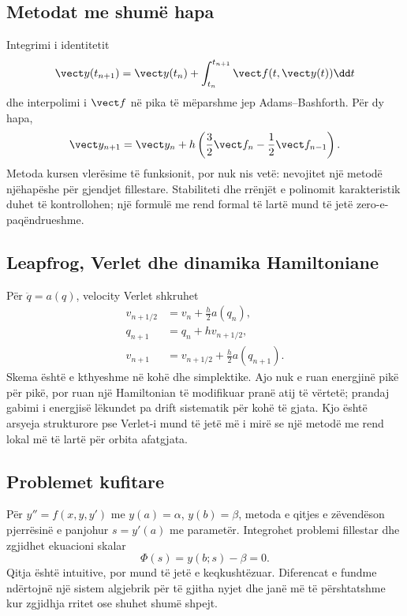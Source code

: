 \subsection{Metodat me shumë hapa}
Integrimi i identitetit
\begin{equation}
 \vect y(t_{n+1})=\vect y(t_n)+\int_{t_n}^{t_{n+1}}\vect f(t,\vect y(t))\dd t
\end{equation}
dhe interpolimi i $\vect f$ në pika të mëparshme jep Adams--Bashforth. Për dy hapa,
\begin{equation}
 \vect y_{n+1}=\vect y_n+h\left(\frac32\vect f_n-\frac12\vect f_{n-1}\right).
\end{equation}
Metoda kursen vlerësime të funksionit, por nuk nis vetë: nevojitet një metodë njëhapëshe për gjendjet fillestare. Stabiliteti dhe rrënjët e polinomit karakteristik duhet të kontrollohen; një formulë me rend formal të lartë mund të jetë zero-e-paqëndrueshme.

\subsection{Leapfrog, Verlet dhe dinamika Hamiltoniane}
Për $\ddot q=a(q)$, velocity Verlet shkruhet
\begin{align}
 v_{n+1/2}&=v_n+\frac h2a(q_n),\\
 q_{n+1}&=q_n+hv_{n+1/2},\\
 v_{n+1}&=v_{n+1/2}+\frac h2a(q_{n+1}).
\end{align}
Skema është e kthyeshme në kohë dhe simplektike. Ajo nuk e ruan energjinë pikë për pikë, por ruan një Hamiltonian të modifikuar pranë atij të vërtetë; prandaj gabimi i energjisë lëkundet pa drift sistematik për kohë të gjata. Kjo është arsyeja strukturore pse Verlet-i mund të jetë më i mirë se një metodë me rend lokal më të lartë për orbita afatgjata.

\subsection{Problemet kufitare}
Për $y''=f(x,y,y')$ me $y(a)=\alpha$, $y(b)=\beta$, metoda e qitjes e zëvendëson pjerrësinë e panjohur $s=y'(a)$ me parametër. Integrohet problemi fillestar dhe zgjidhet ekuacioni skalar
\begin{equation}
 \Phi(s)=y(b;s)-\beta=0.
\end{equation}
Qitja është intuitive, por mund të jetë e keqkushtëzuar. Diferencat e fundme ndërtojnë një sistem algjebrik për të gjitha nyjet dhe janë më të përshtatshme kur zgjidhja rritet ose shuhet shumë shpejt.

